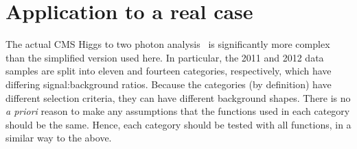 
\section{Application to a real case}
\label{sec:discussion}
\label{sec:discussion:higgs}


The actual CMS
Higgs to two photon analysis~\cite{ref:introduction:legacy}
is significantly more
complex than the simplified version used here. In particular, the 2011 
and 2012 data
samples are split into eleven and fourteen categories, respectively, which have
differing signal:background ratios.
Because the categories (by definition) have different selection criteria,
they can have different background shapes.
There is no {\it a priori} reason to make any assumptions that the functions
used in each category should be the same. Hence, each category should be
tested with all functions, in a similar way to the above.

